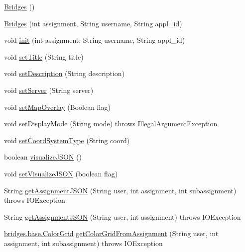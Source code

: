 \begin{DoxyCompactItemize}
\item 
\hyperlink{classbridges_1_1connect_1_1_bridges_a42f0592841a829f93453506c78951b1f}{Bridges} ()
\item 
\hyperlink{classbridges_1_1connect_1_1_bridges_a4c47eb7cbb94c5810dc38c38760db872}{Bridges} (int assignment, String username, String appl\+\_\+id)
\item 
void \hyperlink{classbridges_1_1connect_1_1_bridges_a87aa73367a43cfc8b3ae5e4926ea4895}{init} (int assignment, String username, String appl\+\_\+id)
\item 
void \hyperlink{classbridges_1_1connect_1_1_bridges_aed3752ee6318a48dff271d9a9e2a8fcc}{set\+Title} (String title)
\item 
void \hyperlink{classbridges_1_1connect_1_1_bridges_a50d1d5aa64d312393b63d1be854e34a2}{set\+Description} (String description)
\item 
void \hyperlink{classbridges_1_1connect_1_1_bridges_ab43e412448e1dfc340e58c407519a576}{set\+Server} (String server)
\item 
void \hyperlink{classbridges_1_1connect_1_1_bridges_a4af383ba2f114ad7bd4e08eb44096973}{set\+Map\+Overlay} (Boolean flag)
\item 
void \hyperlink{classbridges_1_1connect_1_1_bridges_aaa1a44a689daa26a841d0e8d31839861}{set\+Display\+Mode} (String mode)  throws Illegal\+Argument\+Exception 
\item 
void \hyperlink{classbridges_1_1connect_1_1_bridges_ade4a9c43e2b608e6b3dc774b73f95749}{set\+Coord\+System\+Type} (String coord)
\item 
boolean \hyperlink{classbridges_1_1connect_1_1_bridges_afd3c63780396e92c94c923037385b31d}{visualize\+J\+S\+O\+N} ()
\item 
void \hyperlink{classbridges_1_1connect_1_1_bridges_aa502aa32a9ac482da9c8455c6810b64d}{set\+Visualize\+J\+S\+O\+N} (boolean flag)
\item 
String \hyperlink{classbridges_1_1connect_1_1_bridges_adcecf323f00525d1bcbfa1d9f0c9bcd5}{get\+Assignment\+J\+S\+O\+N} (String user, int assignment, int subassignment)  throws I\+O\+Exception 
\item 
String \hyperlink{classbridges_1_1connect_1_1_bridges_afc50484079d67ca3e1fe181c25ffc848}{get\+Assignment\+J\+S\+O\+N} (String user, int assignment)  throws I\+O\+Exception 
\item 
\hyperlink{classbridges_1_1base_1_1_color_grid}{bridges.\+base.\+Color\+Grid} \hyperlink{classbridges_1_1connect_1_1_bridges_ad7da1801d21fb94df13b90e96864e041}{get\+Color\+Grid\+From\+Assignment} (String user, int assignment, int subassignment)  throws I\+O\+Exception 

\end{DoxyCompactItemize}
